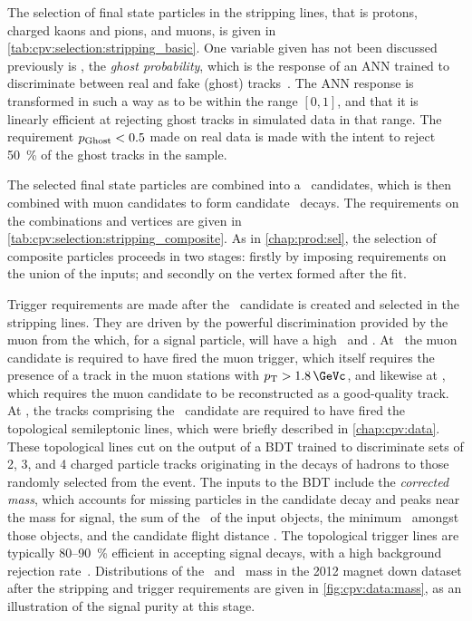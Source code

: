 The selection of final state particles in the stripping lines, that is protons, 
charged kaons and pions, and muons, is given in 
\cref{tab:cpv:selection:stripping_basic}.
One variable given has not been discussed previously is \pghost, the 
\emph{ghost probability}, which is the response of an \ac{ANN} trained to 
discriminate between real and fake (ghost) tracks~\cite{Brehmer:1478372}.
The \ac{ANN} response is transformed in such a way as to be within the range 
$[0, 1]$, and that it is linearly efficient at rejecting ghost tracks in 
simulated data in that range.
The requirement $p_{\text{Ghost}} < 0.5$ made on real data is made with the intent to 
reject \SI{50}{\percent} of the ghost tracks in the sample.

The selected final state particles are combined into a \LcTophh\ candidates, 
which is then combined with muon candidates to form candidate \LbToLcmuX\ 
decays.
The requirements on the combinations and vertices are given in 
\cref{tab:cpv:selection:stripping_composite}.
As in \cref{chap:prod:sel}, the selection of composite particles proceeds in 
two stages: firstly by imposing requirements on the union of the inputs; and 
secondly on the vertex formed after the fit.

Trigger requirements are made after the \PLambdab\ candidate is created and 
selected in the stripping lines.
They are driven by the powerful discrimination provided by the muon from the 
\PLambdab which, for a signal particle, will have a high \pT\ and \ipchisq.
At \lzero\ the muon candidate is required to have fired the muon trigger, which 
itself requires the presence of a track in the muon stations with $\pT > 
\SI{1.8}{\GeVc}$, and likewise at \hltone, which requires the \lzero muon 
candidate to be reconstructed as a good-quality track.
At \hlttwo, the tracks comprising the \PLambdab\ candidate are required to have 
fired the topological semileptonic \PB lines, which were briefly described in 
\cref{chap:cpv:data}.
These topological lines cut on the output of a \ac{BDT} trained to discriminate 
sets of 2, 3, and 4 charged particle tracks originating in the decays of \PB 
hadrons to those randomly selected from the event.
The inputs to the \ac{BDT} include the \emph{corrected mass}, which accounts 
for missing particles in the candidate \PB decay and peaks near the \PB mass 
for signal, the sum of the \pT\ of the input objects, the minimum \pT\ amongst 
those objects, and the \PB candidate flight distance \chisq.
The topological trigger lines are typically 80--\SI{90}{\percent} efficient in 
accepting signal \PB decays, with a high background rejection 
rate~\cite{Gligorov:2011qxa}.
Distributions of the \pKK\ and \ppipi\ mass in the 2012 magnet down dataset 
after the stripping and trigger requirements are given in 
\cref{fig:cpv:data:mass}, as an illustration of the signal purity at this 
stage.

